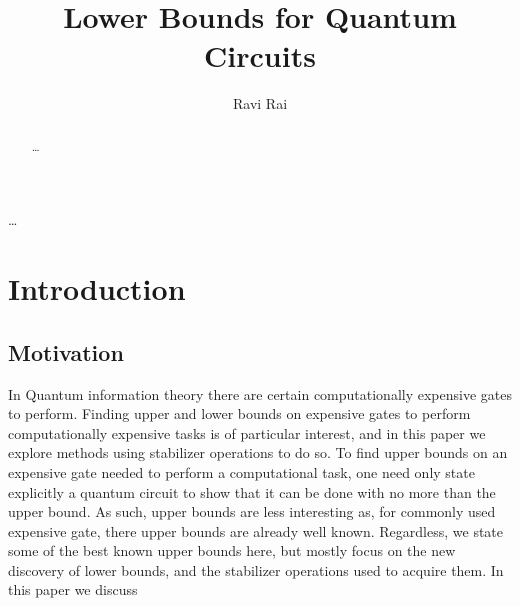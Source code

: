 \documentclass[12pt]{dalthesis}
\begin{document}
\title{Lower Bounds for Quantum Circuits}
\author{Ravi Rai}

\mcs  %




\dedicate{\ldots}

\nolistoftables
\nolistoffigures

\frontmatter

\begin{abstract}
\ldots
\end{abstract}

\begin{acknowledgements}
\ldots
\end{acknowledgements}

\mainmatter

\chapter{Introduction}
\section{Motivation}
In Quantum information theory there are certain computationally expensive gates to perform. Finding upper and lower bounds on expensive gates to perform computationally expensive tasks is of particular interest, and in this paper we explore methods using stabilizer operations to do so. To find upper bounds on an expensive gate needed to perform a computational task, one need only state explicitly a quantum circuit to show that it can be done with no more than the upper bound. As such, upper bounds are less interesting as, for commonly used expensive gate, there upper bounds are already well known. Regardless, we state some of the best known upper bounds here, but mostly focus on the new discovery of lower bounds, and the stabilizer operations used to acquire them.
In this paper we discuss 
\end{document}
